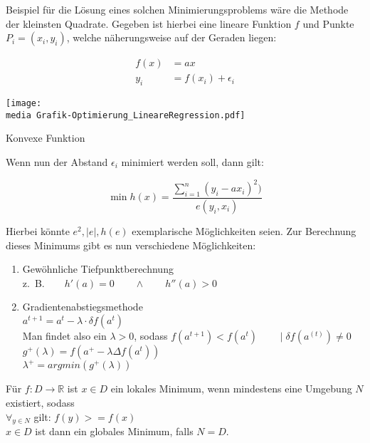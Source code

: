 \begin{Thm}
Beispiel für die Lösung eines solchen Minimierungsproblems wäre die Methode der kleinsten Quadrate. Gegeben ist hierbei eine lineare Funktion $f$ und Punkte $P_i=(x_i,y_i)$, welche näherungsweise auf der Geraden liegen:

\begin{align*}
f(x) &= ax \\
y_i &= f(x_i) + \epsilon_{i}
\end{align*}

\begin{dsafigure}
\begin{center}
\texttt{[image: \\media Grafik-Optimierung\_LineareRegression.pdf]}
\caption{Konvexe Funktion}
\label{figure:Grafik-Optimierung_LineareRegression.pdf}
\end{center}
\end{dsafigure}

Wenn nun der Abstand $\epsilon_i$ minimiert werden soll, dann gilt:

\begin{equation*}
\min h(x)=\frac{\sum_{i=1}^n(y_i-ax_i)^2)}{e(y_i,x_i)}
\end{equation*}

Hierbei könnte $e^2,\mid e\mid, h(e)$ exemplarische Möglichkeiten seien. Zur Berechnung dieses Minimums gibt es nun verschiedene Möglichkeiten:

\begin{enumerate}
\item Gewöhnliche Tiefpunktberechnung \\
z.~B.$\qquad h'(a)=0\qquad \wedge\qquad h''(a)>0$
\item Gradientenabstiegsmethode \\
$a^{t+1}  =a^{t} - \lambda \cdot \delta f(a^{t})$ \\
Man findet also ein $\lambda > 0$, sodass
$f(a^{t+1}) < f(a^{t})  \qquad \mid \delta f(a^{(t)}) \neq 0$ \\
$g^{+}(\lambda)=f(a^+-\lambda\Delta f(a^t))$ \\
$\lambda^+=argmin(g^+(\lambda))$
\end{enumerate}

\end{Thm}

\begin{Def}
Für $f: D\rightarrow \mathbb{R}$ ist $x\in D$ ein lokales Minimum, wenn mindestens eine Umgebung $N$ existiert, sodass \\$\forall_{y\in N}$ gilt: $f(y)>=f(x)$ \\
$x\in D$ ist dann ein globales Minimum, falls $N=D$.
\end{Def}

